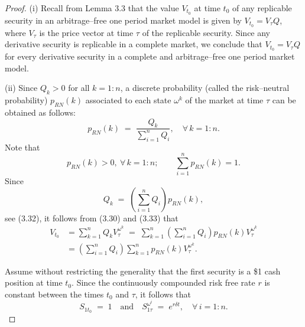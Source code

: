\begin{proof}
(i) Recall from Lemma 3.3 that the value $V_{t_0}$ at time $t_0$ of any
replicable security in an arbitrage--free one period market model is given
by $V_{t_0} = V_\tau Q$, where $V_\tau$ is the price vector at time $\tau$
of the replicable security. Since any derivative security is replicable in
a complete market, we conclude that $V_{t_0} = V_\tau Q$ for every
derivative security in a complete and arbitrage--free one period market
model.

(ii) Since $Q_k > 0$ for all $k = 1:n$, a discrete probability (called the
risk--neutral probability) $p_{RN}(k)$ associated to each state $\omega^k$
of the market at time $\tau$ can be obtained as follows:
\begin{equation}
p_{RN}(k) \;=\; \frac{Q_k}{\sum_{i=1}^n Q_i}, \quad \forall\, k = 1:n.
\end{equation}
Note that
\[
p_{RN}(k) > 0, \ \forall\, k = 1:n; \qquad \sum_{i=1}^n p_{RN}(k) = 1.
\]
Since
\begin{equation}
Q_k \;=\; \left( \sum_{i=1}^n Q_i \right) p_{RN}(k),
\end{equation}
see (3.32), it follows from (3.30) and (3.33) that
\begin{equation}
\begin{split}
V_{t_0} &= \sum_{k=1}^n Q_k V_\tau^{\omega^k} \;=\; \sum_{k=1}^n \left(
\sum_{i=1}^n Q_i \right) p_{RN}(k) V_\tau^{\omega^k} \\
&= \left( \sum_{i=1}^n Q_i \right) \sum_{k=1}^n p_{RN}(k) V_\tau^{\omega^k}.
\end{split}
\end{equation}

Assume without restricting the generality that the first security is a \$1
cash position at time $t_0$. Since the continuously compounded risk free
rate $r$ is constant between the times $t_0$ and $\tau$, it follows that
\begin{equation}
S_{1t_0} \;=\; 1 \quad \text{and} \quad S_{1\tau}^{\omega^i} \;=\;
e^{r\delta t}, \quad \forall\, i = 1:n.
\end{equation}


\end{proof}
